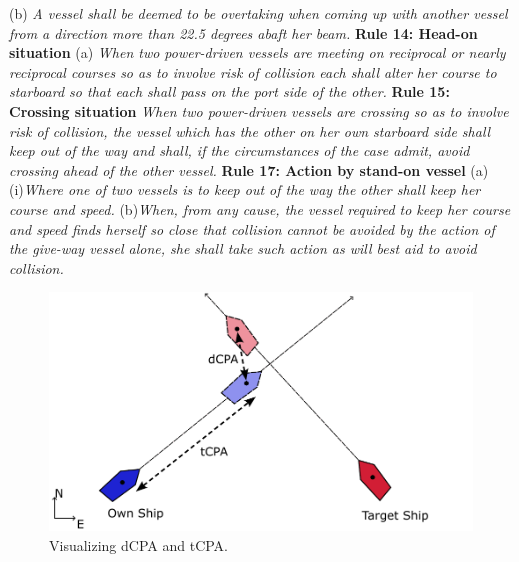 (b) \textit{A vessel shall be deemed to be overtaking when coming up with another vessel from a direction more than 22.5 degrees abaft her beam.}\newline
\textbf{Rule 14: Head-on situation}\newline
(a) \textit{When two power-driven vessels are meeting on reciprocal or nearly reciprocal courses so as to involve risk of collision each shall alter her 
course to starboard so that each shall pass on the port side of the other.}\newline
\textbf{Rule 15: Crossing situation}\newline
\textit{When two power-driven vessels are crossing so as to involve risk of collision, the vessel which has the other on her own starboard 
side shall keep out of the way and shall, if the circumstances of the case admit, avoid crossing ahead of the other vessel.}\newline
\textbf{Rule 17: Action by stand-on vessel}\newline
(a)(i)\textit{Where one of two vessels is to keep out of the way the other shall keep her course and speed.}\newline
(b)\textit{When, from any cause, the vessel required to keep her course and speed finds herself so close that collision 
cannot be avoided by the action of the give-way vessel alone, she shall take such action as will best aid to avoid collision.}

\begin{figure}[t]
    \centering
    \includegraphics[width=\textwidth]{Images/shipCPA.pdf}
    \caption{Visualizing dCPA and tCPA.}
    \label{FIG: ship CPA}
\end{figure}


